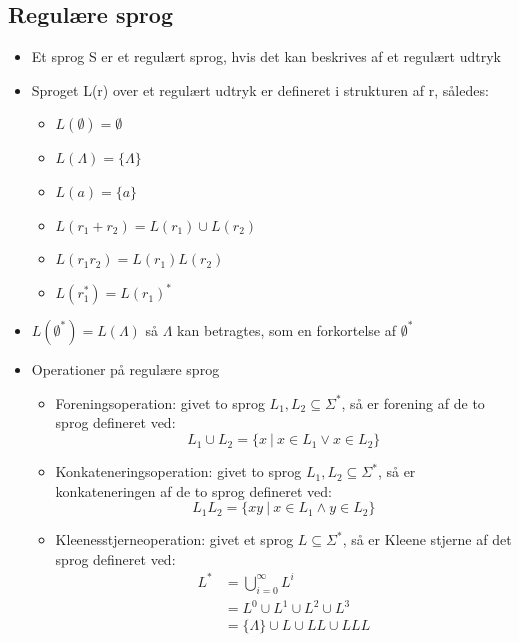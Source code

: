 \documentclass[a4, danish]{article}
\begin{document}
\subsection{Regulære sprog}
  \begin{itemize}
    \item Et sprog S er et regulært sprog, hvis det kan beskrives af et regulært udtryk
    \item Sproget L(r) over et regulært udtryk er defineret i strukturen af r, således: 
    \begin{itemize}
      \item $L(\emptyset)=\emptyset $
      \item $L(\Lambda)=\{ \Lambda \}$
      \item $L(a)=\{a\}$
      \item $L(r_1+r_2)=L(r_1)\cup L(r_2)$
      \item $L(r_1r_2)=L(r_1)L(r_2)$
      \item $L(r_1^*)=L(r_1)^*$
    \end{itemize}
    \item $L(\emptyset^*)=L(\Lambda)$ så $\Lambda$ kan betragtes, som en forkortelse af $\emptyset^*$
    \item Operationer på regulære sprog
    \begin{itemize}
	    \item Foreningsoperation: givet to sprog $L_1,L_2\subseteq \Sigma^*$, så er forening af de to sprog defineret ved:
      \begin{equation*}
        L_1\cup L_2 = \{x \ | \ x\in L_1 \lor x\in L_2 \}
      \end{equation*}
      \item Konkateneringsoperation: givet to sprog $L_1,L_2\subseteq \Sigma^*$, så er konkateneringen af de to sprog defineret ved:
      \begin{equation*}
        L_1L_2= \{xy \ | \ x\in L_1 \land y\in L_2 \}
       \end{equation*}
      \item Kleenesstjerneoperation: givet et sprog $L \subseteq \Sigma^*$, så er Kleene stjerne af det sprog defineret ved:
      \begin{align*}
        L^* &= \bigcup_{i=0}^{\infty} L^i \\
            &= L^0\cup L^1 \cup L^2 \cup L^3  \\
            &= \{\Lambda \} \cup L \cup LL \cup LLL 
      \end{align*}
    \end{itemize}

\end{itemize}
\end{document}
